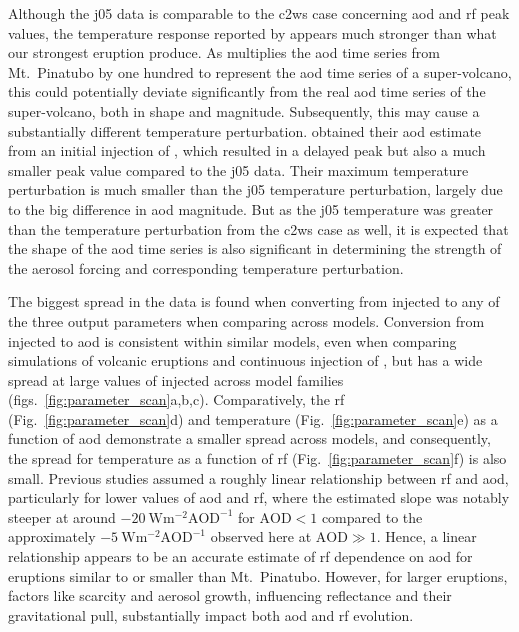 \documentclass{ametsocV6.1}
\newcommand{\iso}[1][i]{{#1}njected \ce{SO2}}
\begin{document}
Although the \gls{j05} data is comparable to the \gls{c2ws} case concerning \gls{aod}
and \gls{rf} peak values, the temperature response reported by \citet{jones2005} appears
much stronger than what our strongest eruption produce. As \citet{jones2005} multiplies
the \gls{aod} time series from Mt.\ Pinatubo by one hundred to represent the \gls{aod}
time series of a super-volcano, this could potentially deviate significantly from the
real \gls{aod} time series of the super-volcano, both in shape and magnitude.
Subsequently, this may cause a substantially different temperature perturbation.
\citet{timmreck2010} obtained their \gls{aod} estimate from an initial injection of
, which resulted in a delayed peak but also a much smaller peak value compared
to the \gls{j05} data. Their maximum temperature perturbation is much smaller than the
\gls{j05} temperature perturbation, largely due to the big difference in \gls{aod}
magnitude. But as the \gls{j05} temperature was greater than the temperature
perturbation from the \gls{c2ws} case as well, it is expected that the shape of the
\gls{aod} time series is also significant in determining the strength of the aerosol
forcing and corresponding temperature perturbation.

The biggest spread in the data is found when converting from \iso{} to any of the three
output parameters when comparing across models. Conversion from \iso{} to \gls{aod} is
consistent within similar models, even when comparing simulations of volcanic eruptions
\citep{timmreck2010} and continuous injection of  \citep{niemeier2015}, but has
a wide spread at large values of \iso{} across model families
(figs.~\ref{fig:parameter_scan}a,b,c). Comparatively, the \gls{rf}
(Fig.~\ref{fig:parameter_scan}d) and temperature (Fig.~\ref{fig:parameter_scan}e) as a
function of \gls{aod} demonstrate a smaller spread across models, and consequently, the
spread for temperature as a function of \gls{rf} (Fig.~\ref{fig:parameter_scan}f) is
also small. Previous studies assumed a roughly linear relationship between \gls{rf} and
\gls{aod}, particularly for lower values of \gls{aod} and \gls{rf}, where the estimated
slope was notably steeper at around \(\SI{-20}{\watt\metre^{-2}\mathrm{AOD}^{-1}}\) for
\(\mathrm{AOD}<1\) compared to the approximately
\(\SI{-5}{\watt\metre^{-2}\mathrm{AOD}^{-1}}\) observed here at \(\mathrm{AOD}\gg1\).
Hence, a linear relationship appears to be an accurate estimate of \gls{rf} dependence
on \gls{aod} for eruptions similar to or smaller than Mt.\ Pinatubo. However, for larger
eruptions, factors like  scarcity and aerosol growth, influencing reflectance and
their gravitational pull, substantially impact both \gls{aod} and \gls{rf} evolution.
\end{document}
